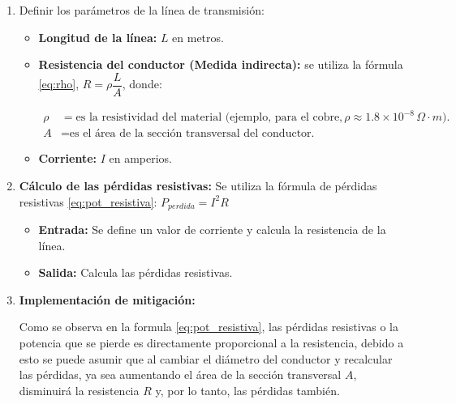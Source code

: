         \begin{enumerate}
            \item Definir los parámetros de la línea de transmisión:

                \begin{itemize}
                    \item \textbf{Longitud de la línea:} $L$ en metros.

                    \item \textbf{Resistencia del conductor (Medida indirecta):} se utiliza la fórmula \ref{eq:rho}, $R=\rho        \dfrac{L}{A}$, donde:

                        \begin{align*}
                            \rho &= \text{es la resistividad del material (ejemplo, para el cobre,} \, \rho \approx 1.8 \times 10^{-8} \, \Omega \cdot m). \\[0.2cm]
                            A &= \text{es el área de la sección transversal del conductor.}
                        \end{align*}

                    \item \textbf{Corriente: } $I$ en amperios.
                    
                \end{itemize}

            \item \textbf{Cálculo de las pérdidas resistivas:} Se utiliza la fórmula de pérdidas resistivas \ref{eq:pot_resistiva}: $P_{perdida}=I^2R$

                \begin{itemize}
                    \item \textbf{Entrada:}  Se define un valor de corriente y calcula la resistencia de la línea.

                    
                    \item \textbf{Salida:} Calcula las pérdidas resistivas.
                \end{itemize}

            \item \textbf{Implementación de mitigación:}

                Como se observa en la formula \ref{eq:pot_resistiva}, las pérdidas resistivas o la potencia que se pierde es directamente proporcional a la resistencia, debido a esto se puede asumir que al cambiar el diámetro del conductor y recalcular las pérdidas, ya sea aumentando el área de la sección transversal $A$, disminuirá la resistencia $R$ y, por lo tanto, las pérdidas también. 


\end{enumerate}
